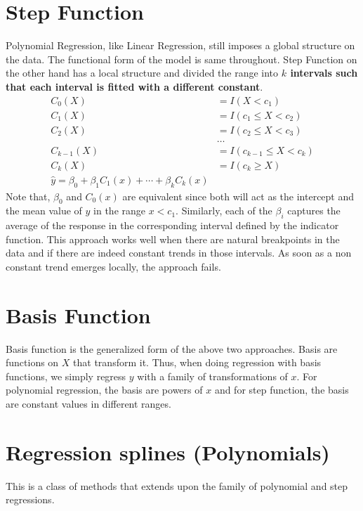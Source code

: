 \documentclass[../statistical_learning_notes.tex]{subfiles}
\begin{document}
    \section{Step Function}
    Polynomial Regression, like Linear Regression, still imposes a global structure on the data. The functional form of the model is same throughout. Step Function on the other hand has a local structure and divided the range into \textbf{$k$ intervals such that each interval is fitted with a different constant}.
    \begin{align*}
        C_{0}(X) &= I(X < c_{1})\\
        C_{1}(X) &= I(c_{1} \leq X < c_{2})\\
        C_{2}(X) &= I(c_{2} \leq X < c_{3})\\
        &\hdots\\
        C_{k-1}(X) &= I(c_{k-1} \leq X < c_{k})\\
        C_{k}(X) &= I(c_{k} \geq X)\\
        \hat{y} = \beta_{0} + \beta_{1}C_{1}(x) + \cdots + \beta_{k}C_{k}(x)
    \end{align*}
    Note that, $\beta_{0}$ and $C_{0}(x)$ are equivalent since both will act as the intercept and the mean value of $y$ in the range $x < c_{1}$. Similarly, each of the $\beta_{i}$ captures the average of the response in the corresponding interval defined by the indicator function.\newline
    This approach works well when there are natural breakpoints in the data and if there are indeed constant trends in those intervals. As soon as a non constant trend emerges locally, the approach fails.

    
    \section{Basis Function}
    Basis function is the generalized form of the above two approaches. Basis are functions on $X$ that transform it. Thus, when doing regression with basis functions, we simply regress $y$ with a family of transformations of $x$.\newline
    For polynomial regression, the basis are powers of $x$ and for step function, the basis are constant values in different ranges.

    
    \section{Regression splines (Polynomials)}
    This is a class of methods that extends upon the family of polynomial and step regressions.\newline
\end{document}
